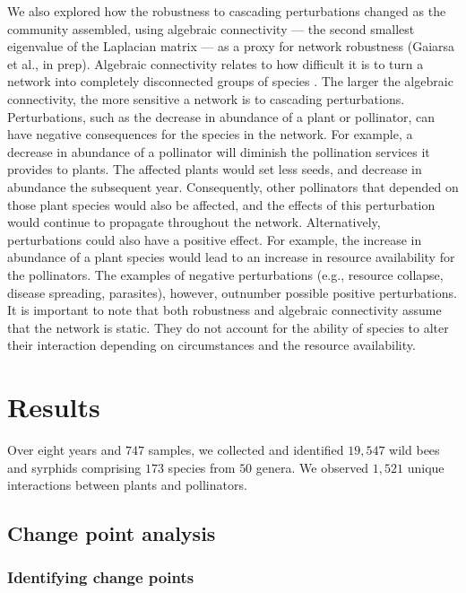 \documentclass[12pt]{article}
\begin{document}
We also explored how the robustness to cascading perturbations changed
as the community assembled, using algebraic connectivity --- the
second smallest eigenvalue of the Laplacian matrix
\citep{fiedler1973algebraic} --- as a proxy for network robustness
(Gaiarsa et al., in prep). Algebraic connectivity relates to how
difficult it is to turn a network into completely disconnected groups
of species \citep{costa2007characterization, gibert2013spatial}. The
larger the algebraic connectivity, the more sensitive a network is to
cascading perturbations. Perturbations, such as the decrease in
abundance of a plant or pollinator, can have negative consequences for
the species in the network. For example, a decrease in abundance of a
pollinator will diminish the pollination services it provides to
plants. The affected plants would set less seeds, and decrease in
abundance the subsequent year. Consequently, other pollinators that
depended on those plant species would also be affected, and the
effects of this perturbation would continue to propagate throughout
the network. Alternatively, perturbations could also have a positive
effect. For example, the increase in abundance of a plant species
would lead to an increase in resource availability for the
pollinators. The examples of negative perturbations (e.g., resource
collapse, disease spreading, parasites), however, outnumber possible
positive perturbations. It is important to note that both robustness
and algebraic connectivity assume that the network is static. They do
not account for the ability of species to alter their interaction
depending on circumstances and the resource availability.

\section*{Results}
\label{sec:results}

Over eight years and $747$ samples, we collected and identified
$19,547$ wild bees and syrphids comprising $173$ species from $50$
genera. We observed $1,521$ unique interactions between plants and
pollinators.

\subsection*{Change point analysis}
\subsubsection*{Identifying change points}
\end{document}

